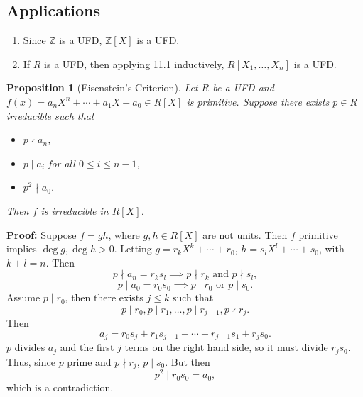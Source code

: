 \documentclass[12pt]{article}
\newtheorem{proposition}{Proposition}[section]
\theoremstyle{definition}
\theoremstyle{remark}
\begin{document}
\subsection{Applications}%
\label{sub:Applications}

\begin{enumerate}[label = (\roman*)]
	\item Since $\mathbb{Z}$ is a UFD, $\mathbb{Z}[X]$ is a UFD.
	\item If $R$ is a UFD, then applying 11.1 inductively, $R[X_1, \ldots, X_n]$ is a UFD.
\end{enumerate}

\begin{proposition}[Eisenstein's Criterion]
	Let $R$ be a UFD and $f(x) = a_nX^{n} + \cdots + a_1 X + a_0 \in R[X]$ is primitive. Suppose there exists $p \in R$ irreducible such that
	\begin{itemize}
		\item $p \nmid a_n$,
		\item $p \mid a_i$ for all $0 \leq i \leq n-1$,
		\item $p^2 \nmid a_0$.
	\end{itemize}
	Then $f$ is irreducible in $R[X]$.
\end{proposition}

\begin{adjustbox}{minipage = \columnwidth - 25.5pt, margin=1em, frame=1pt, margin=0em}
	\textbf{Proof:} Suppose $f = gh$, where $g, h \in R[X]$ are not units. Then $f$ primitive implies $\deg g , \deg h > 0$. Letting $g = r_k X^{k} + \cdots + r_0$, $h = s_l X^{l} + \cdots + s_0$, with $k + l = n$. Then
	\[
		p \nmid a_n = r_k s_l \implies p \nmid r_k \text{ and } p \nmid s_l
	,\]
	\[
		p \mid a_0 = r_0 s_0 \implies p \mid r_0 \text{ or } p \mid s_0
	.\]
	 Assume $p \mid r_0$, then there exists $j \leq k$ such that
	 \[
	 p \mid r_0, p \mid r_1, \ldots, p \mid r_{j - 1}, p \nmid r_{j}
	 .\]
	 Then
	 \[
	 a_j = r_0s_j + r_1s_{j - 1} + \cdots + r_{j - 1}s_1 + r_js_0
	 .\]
	 $p$ divides $a_j$ and the first $j$ terms on the right hand side, so it must divide $r_j s_0$. Thus, since $p$ prime and $p \nmid r_j$, $p \mid s_0$. But then
	 \[
	 p^2 \mid r_0 s_0 = a_0
	 ,\]
	 which is a contradiction.
\end{adjustbox}
\end{document}
